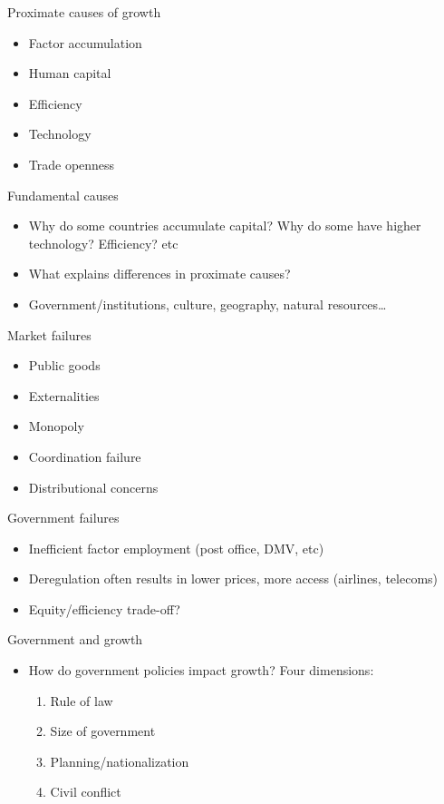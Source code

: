 \documentclass[10pt]{beamer}
\begin{document}
\begin{frame}[label={sec:org6bd62b7}]{}
\alert{Proximate causes of growth}
\begin{itemize}
\item Factor accumulation
\item Human capital
\item Efficiency
\item Technology
\item Trade openness
\end{itemize}
\end{frame}

\begin{frame}[label={sec:orgfc2380e}]{}
\alert{Fundamental causes}
\begin{itemize}
\item Why do some countries accumulate capital? Why do some have higher technology? Efficiency? etc
\item What explains differences in proximate causes?
\item Government/institutions, culture, geography, natural resources\ldots{}
\end{itemize}
\end{frame}

\begin{frame}[label={sec:org0cd462c}]{}
\alert{Market failures}
\begin{itemize}
\item Public goods
\item Externalities
\item Monopoly
\item Coordination failure
\item Distributional concerns
\end{itemize}
\end{frame}

\begin{frame}[label={sec:orgc0a1ff2}]{}
\alert{Government failures}
\begin{itemize}
\item Inefficient factor employment (post office, DMV, etc)
\item Deregulation often results in lower prices, more access (airlines, telecoms)
\item Equity/efficiency trade-off?
\end{itemize}
\end{frame}

\begin{frame}[label={sec:org6a3aad0}]{}
\alert{Government and growth}
\begin{itemize}
\item How do government policies impact growth? Four dimensions:
\begin{enumerate}
\item Rule of law
\item Size of government
\item Planning/nationalization
\item Civil conflict
\end{enumerate}
\end{itemize}
\end{frame}
\end{document}
